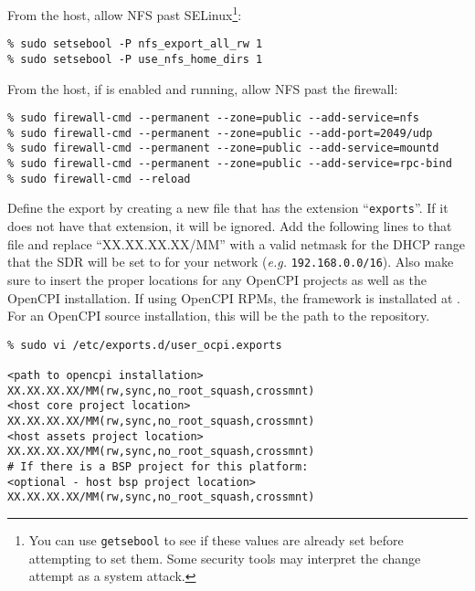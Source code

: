 From the host, allow NFS past SELinux\footnote{You can use \texttt{getsebool} to see if these values are already set before attempting to set them. Some security tools may interpret the change attempt as a system attack.}:
\begin{verbatim}
% sudo setsebool -P nfs_export_all_rw 1
% sudo setsebool -P use_nfs_home_dirs 1
\end{verbatim}

From the host, if  is enabled and running, allow NFS past the firewall:
\begin{verbatim}
% sudo firewall-cmd --permanent --zone=public --add-service=nfs
% sudo firewall-cmd --permanent --zone=public --add-port=2049/udp
% sudo firewall-cmd --permanent --zone=public --add-service=mountd
% sudo firewall-cmd --permanent --zone=public --add-service=rpc-bind
% sudo firewall-cmd --reload
\end{verbatim}

Define the export by creating a new file that has the extension ``\texttt{exports}''. If it does not have that extension, it will be ignored.  Add the following lines to that file and replace ``XX.XX.XX.XX/MM'' with a valid netmask for the DHCP range that the SDR will be set to for your network (\textit{e.g.} \texttt{192.168.0.0/16}). Also make sure to insert the proper locations for any OpenCPI projects as well as the OpenCPI installation. If using OpenCPI RPMs, the framework is installated at . For an OpenCPI source installation, this will be the path to the  repository.

\begin{verbatim}
% sudo vi /etc/exports.d/user_ocpi.exports

<path to opencpi installation>          XX.XX.XX.XX/MM(rw,sync,no_root_squash,crossmnt)
<host core project location>            XX.XX.XX.XX/MM(rw,sync,no_root_squash,crossmnt)
<host assets project location>          XX.XX.XX.XX/MM(rw,sync,no_root_squash,crossmnt)
# If there is a BSP project for this platform:
<optional - host bsp project location>  XX.XX.XX.XX/MM(rw,sync,no_root_squash,crossmnt)
\end{verbatim}

